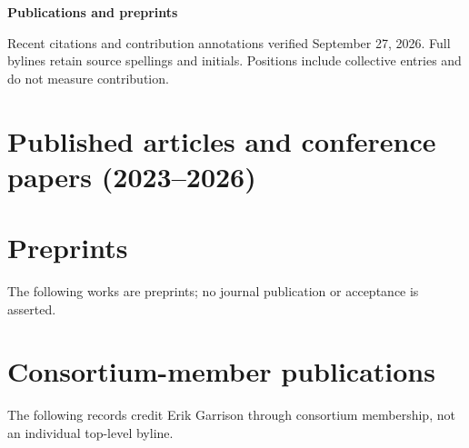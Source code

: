 \documentclass[11pt,hidelinks,letterpaper]{article}
\begin{document}
\hfill \break
\hfill \break
\noindent
{\LARGE \bf Publications and preprints}

\medskip
\noindent Recent citations and contribution annotations verified September 27, 2026.
Full bylines retain source spellings and initials. Positions include collective entries and do not measure contribution.
\begingroup
\let\oldthebibliography\thebibliography
\let\endoldthebibliography\endthebibliography
\renewenvironment{thebibliography}[1]{%
  \begin{oldthebibliography}{#1}
  \setlength{\itemsep}{0.6em}
  \setlength{\parskip}{0em}
}{\end{oldthebibliography}}
\renewcommand{\refname}{}

\section*{Published articles and conference papers (2023--2026)}

\begin{bibunit}[unsrt]
\nocite{bolognini2026cosigt,
hansen2026benchmark,
huang2025language,
edwards2025multispecies,
helmy2025mouse,
kaplan2025pangenomicsbench,
potapova2025rdna,
deLima2025robertsonian,
kronenberg2025platinum,
varki2025rindex,
porubsky2025denovo,
yoo2025apes,
wei2025wgatools,
villani2025rats,
cheng2025potato,
parmigiani2024panacus,
gustafson2024nanopore,
koren2024gapless,
li2024gpu,
garrison2023building,
heumos2024nfcore,
bolognini2024amylase,
Heumos_2023,
sperling2024protocol,
de2023revamped,
cochetel2023grape,
Rhie2023,
kille2023minmers,
yang2023infectious,
Sperling_2023,
liao2023draft,
guarracino2023recombination,
marco2023optimal,
sibbesen2023haplotype,
mwaniki2022fast,
garrison2023unbiased}
{\footnotesize
\putbib[references]
}
\end{bibunit}

\section*{Preprints}
The following works are preprints; no journal publication or acceptance is asserted.
\begin{bibunit}[unsrt]
\nocite{lucas2026hprc2,
guarracino2026subtelomeres,
formenti2026vgp,
rocha2026pan,
kaushan2026tracepoints,
solar2025acrocentric,
islam2025pbwt,
shiraishi2025centromere,
wang2025pante,
novak2024annotations}
{\footnotesize
\putbib[references]
}
\end{bibunit}

\section*{Consortium-member publications}
The following records credit Erik Garrison through consortium membership, not an individual top-level byline.
\begin{bibunit}[unsrt]
\nocite{consortium2026_0,
consortium2026_1,
consortium2026_2,
consortium2026_3,
consortium2026_4,
consortium2025_5,
consortium2023_6,
porubsky2023gaps,
consortium2023_14,
consortium2023_15}
{\footnotesize
\putbib[references]
}
\end{bibunit}
\end{document}
